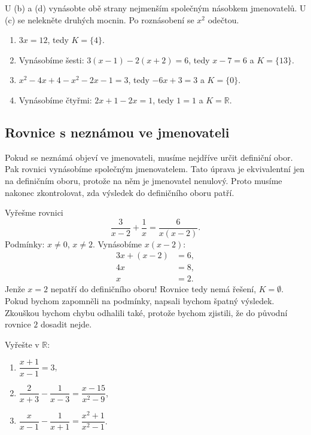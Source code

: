 \begin{hint}
  U (b) a (d) vynásobte obě strany nejmenším společným násobkem jmenovatelů. U (c) se nelekněte druhých mocnin. Po roznásobení se $x^2$ odečtou.
\end{hint}

\begin{solution}
  \begin{enumerate}[label=(\alph*)]
    \item $3x = 12$, tedy $K = \{4\}$.
    \item Vynásobíme šesti: $3(x - 1) - 2(x + 2) = 6$, tedy $x - 7 = 6$ a $K = \{13\}$.
    \item $x^2 - 4x + 4 - x^2 - 2x - 1 = 3$, tedy $-6x + 3 = 3$ a $K = \{0\}$.
    \item Vynásobíme čtyřmi: $2x + 1 - 2x = 1$, tedy $1 = 1$ a $K = \mathbb{R}$.
  \end{enumerate}
\end{solution}

\subsection{Rovnice s neznámou ve jmenovateli}

Pokud se neznámá objeví ve jmenovateli, musíme nejdříve určit definiční obor. Pak rovnici vynásobíme společným jmenovatelem. Tato úprava je ekvivalentní jen na definičním oboru, protože na něm je jmenovatel nenulový. Proto musíme nakonec zkontrolovat, zda výsledek do definičního oboru patří.

\begin{example}
  Vyřešme rovnici
  \begin{equation*}
    \frac{3}{x - 2} + \frac{1}{x} = \frac{6}{x(x - 2)}.
  \end{equation*}
  Podmínky: $x\neq 0$, $x\neq 2$. Vynásobíme $x(x - 2)$:
  \begin{align*}
    3x + (x - 2) &= 6,\\
    4x &= 8,\\
    x &= 2.
  \end{align*}
  Jenže $x = 2$ nepatří do definičního oboru! Rovnice tedy nemá řešení, $K = \emptyset$. Pokud bychom zapomněli na podmínky, napsali bychom špatný výsledek. Zkouškou bychom chybu odhalili také, protože bychom zjistili, že do původní rovnice $2$ dosadit nejde.
\end{example}

\begin{problem}
  Vyřešte v $\mathbb{R}$:
  \begin{enumerate}[label=(\alph*)]
    \item $\dfrac{x + 1}{x - 1} = 3$,
    \item $\dfrac{2}{x + 3} - \dfrac{1}{x - 3} = \dfrac{x - 15}{x^2 - 9}$,
    \item $\dfrac{x}{x - 1} - \dfrac{1}{x + 1} = \dfrac{x^2 + 1}{x^2 - 1}$.
  \end{enumerate}
\end{problem}

